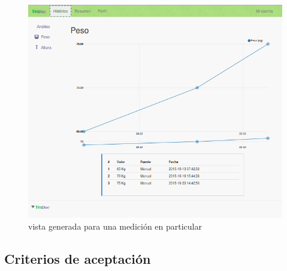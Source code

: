 \begin{figure}[h!]
  \centering
  \includegraphics[width=.8\textwidth]{img/5-grafica_medicion}
  \caption{vista generada para una medición en particular}
  \label{5-grafica_medicion}
\end{figure}

\subsection{Criterios de aceptación}

